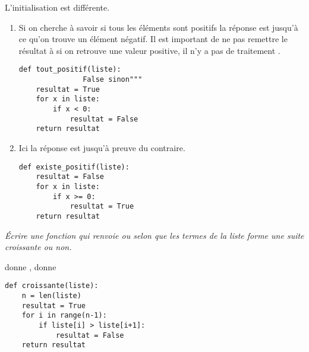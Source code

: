\begin{Answer}
L'initialisation est différente.
\begin{enumerate}
\item  Si on cherche à savoir si tous les éléments sont positifs la réponse est  jusqu'à ce qu'on trouve un élément négatif. Il est important de ne pas remettre le résultat à  si on retrouve une valeur positive, il n'y a pas de traitement .
\begin{lstlisting}
def tout_positif(liste):
               False sinon"""
    resultat = True
    for x in liste:
        if x < 0:
            resultat = False
    return resultat
\end{lstlisting}
\item Ici la réponse est  jusqu'à preuve du contraire.
\begin{lstlisting}
def existe_positif(liste):
    resultat = False
    for x in liste:
        if x >= 0:
            resultat = True
    return resultat
\end{lstlisting}
\end{enumerate}
\end{Answer}
\begin{Exercise}[title=Croissance]\it
Écrire une fonction  qui renvoie  ou  selon que les termes de la liste forme une suite croissante ou non.

 donne , 
 donne 
\end{Exercise}
\begin{Answer}
\begin{lstlisting}
def croissante(liste):
    n = len(liste)
    resultat = True
    for i in range(n-1):
        if liste[i] > liste[i+1]:
            resultat = False
    return resultat
\end{lstlisting}
\newpage
\end{Answer}
